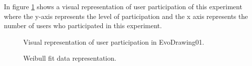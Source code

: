 In figure \ref{fig:userP_3} shows a visual representation of user participation
of this experiment where the y-axis represents the level of participation and
the x axis represents the number of users who participated in this experiment.

\begin{figure}
\centering
{} %
\caption{Visual representation of user participation in EvoDrawing01.}
\label{fig:userP_3}
\end{figure}


\begin{figure}
\centering
{} %
\caption{Weibull fit data representation.}
\label{fig:weibull_3}
\end{figure}

